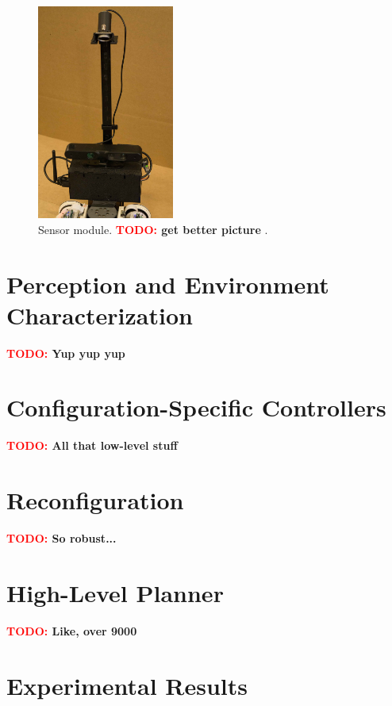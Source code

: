 \documentclass[conference]{IEEEtran}
\newcommand{\TODO}[1]{ {\bf \textcolor{red}{TODO:} #1 }}
\begin{document}
\begin{figure}
\begin{center}
\includegraphics[width=0.4\textwidth]{images/sensor_module.jpg}
\caption{Sensor module. \TODO{get better picture}.}
\label{fig:sensor-module}
\end{center}
\end{figure}

%
%

\section{Perception and Environment Characterization}

\TODO{Yup yup yup}

\section{Configuration-Specific Controllers}

\TODO{All that low-level stuff}

\section{Reconfiguration}

\TODO{So robust...}

\section{High-Level Planner}

\TODO{Like, over 9000}

\section{Experimental Results}
\end{document}

